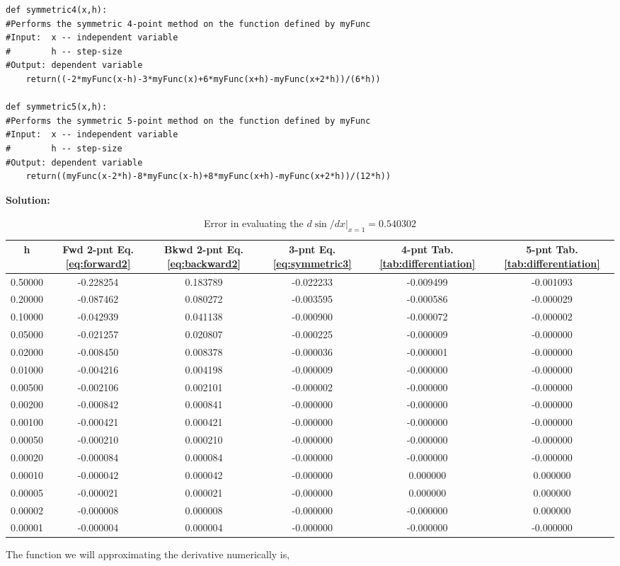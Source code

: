 \documentclass[10pt]{article}
\begin{document}
\begin{lstlisting}
def symmetric4(x,h):
#Performs the symmetric 4-point method on the function defined by myFunc
#Input:  x -- independent variable
#        h -- step-size
#Output: dependent variable
    return((-2*myFunc(x-h)-3*myFunc(x)+6*myFunc(x+h)-myFunc(x+2*h))/(6*h))

def symmetric5(x,h):
#Performs the symmetric 5-point method on the function defined by myFunc
#Input:  x -- independent variable
#        h -- step-size
#Output: dependent variable
    return((myFunc(x-2*h)-8*myFunc(x-h)+8*myFunc(x+h)-myFunc(x+2*h))/(12*h))
\end{lstlisting}
\label{solution:1.1}\textbf{Solution:}
\begin{table}[!ht]
	\begin{center}
	\caption{Error in evaluating the $d \sin /dx|_{x=1}=0.540302$}
		\label{tab:diff_errors}
		\begin{tabular}{|cccccc|}
		\hline
		h & Fwd 2-pnt Eq. \ref{eq:forward2} & Bkwd 2-pnt Eq. \ref{eq:backward2} & 3-pnt Eq. \ref{eq:symmetric3} & 4-pnt Tab. \ref{tab:differentiation} & 5-pnt Tab. \ref{tab:differentiation} \\
		\hline
		0.50000&-0.228254&0.183789&-0.022233&-0.009499&-0.001093\\ 
		0.20000&-0.087462&0.080272&-0.003595&-0.000586&-0.000029\\ 
		0.10000&-0.042939&0.041138&-0.000900&-0.000072&-0.000002\\ 
		0.05000&-0.021257&0.020807&-0.000225&-0.000009&-0.000000\\ 
		0.02000&-0.008450&0.008378&-0.000036&-0.000001&-0.000000\\ 
		0.01000&-0.004216&0.004198&-0.000009&-0.000000&-0.000000\\ 
		0.00500&-0.002106&0.002101&-0.000002&-0.000000&-0.000000\\ 
		0.00200&-0.000842&0.000841&-0.000000&-0.000000&-0.000000\\ 
		0.00100&-0.000421&0.000421&-0.000000&-0.000000&-0.000000\\ 
		0.00050&-0.000210&0.000210&-0.000000&-0.000000&-0.000000\\ 
		0.00020&-0.000084&0.000084&-0.000000&-0.000000&-0.000000\\ 
		0.00010&-0.000042&0.000042&-0.000000&0.000000&0.000000\\ 
		0.00005&-0.000021&0.000021&-0.000000&0.000000&0.000000\\ 
		0.00002&-0.000008&0.000008&-0.000000&-0.000000&0.000000\\ 
		0.00001&-0.000004&0.000004&-0.000000&-0.000000&-0.000000\\ 
		\hline
		\end{tabular}
	\end{center}
\end{table}
The function we will approximating the derivative numerically is,
\end{document}
